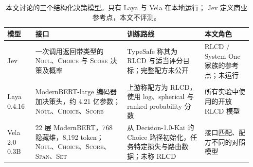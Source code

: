\begin{table}[t]
\centering
\small
\caption{本文讨论的三个结构化决策模型。只有 Laya 与 Vela 在本地运行；
Jev 定义商业参考点，本文不评测。}
\label{tab:models}
\begin{tabular}{@{}p{1.3cm}p{3.7cm}p{4.4cm}p{3.7cm}@{}}
\toprule
模型 & 接口 & 训练路线 & 本文角色 \\
\midrule
Jev & 一次调用返回带类型的 \textsc{Noul}、\textsc{Choice} 与 \textsc{Score} 决策及概率 & TypeSafe 称其为 RLCD 与适当评分目标；完整配方未公开 & RLCD / System One 家族的参考点；未运行 \\
Laya 0.4.16 & ModernBERT-large 编码器加决策头，约 4.21 亿参数；\textsc{Noul}、\textsc{Choice}、\textsc{Score} & 上游称配方为 RLCD，使用 log、spherical 与 ranked probability 分数 & 所有实验中使用的开放 RLCD 模型 \\
Vela 2.0 0.3B & 22 层 ModernBERT，768 隐藏维，8{,}192 token；\textsc{Noul}、\textsc{Choice}、\textsc{Score}、\textsc{Span}、\textsc{Set} & 从 Decision-1.0-Kai 的 Choice 路径初始化，任务特定损失与路由数据；未称 RLCD & 接口匹配、配方不同的对照模型 \\
\bottomrule
\end{tabular}
\end{table}
